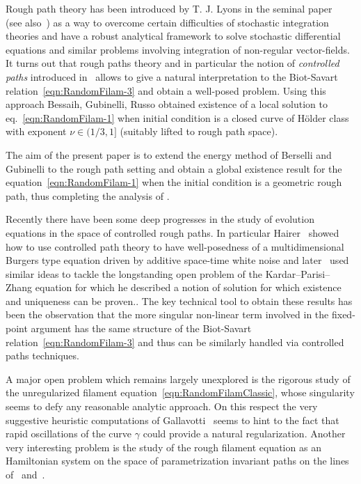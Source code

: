\documentclass[11pt,a4paper,reqno]{amsart}%
\theoremstyle{plain}
\theoremstyle{remark}
\theoremstyle{plain}
\numberwithin{equation}{section}
\begin{document}
Rough path theory has been introduced by T. J. Lyons in the seminal paper~\cite{[Lyons-1998]} (see also~\cites{[LyonsQian-2002],[LionsStFlour],[FrizVictoir]}) as a way to overcome certain difficulties of stochastic integration theories and have a robust analytical framework to solve stochastic differential equations and similar problems involving integration of non-regular vector-fields.
It turns out that rough paths theory and in particular the notion of \emph{controlled paths} introduced in~\cite{[Gubinelli-2004]} allows to give a natural interpretation to the Biot-Savart relation~\eqref{eqn:RandomFilam-3} and obtain a well-posed problem. Using this approach  Bessaih, Gubinelli, Russo \cite{[Bess+Gub_2005]}  obtained existence of a local solution to  eq.~\eqref{eqn:RandomFilam-1} when initial condition is a closed curve of
H\"{o}lder class with exponent $\nu\in ({1}/{3},1]$ (suitably lifted to rough path space).

The aim of the present paper is to extend the energy method of Berselli and Gubinelli to the rough path setting and obtain  a global existence result for the equation~\eqref{eqn:RandomFilam-1}  when the initial condition is a geometric rough path, thus completing the analysis of \cite{[Bess+Gub_2005]}.

Recently there have been some deep progresses in the study of evolution equations in the space of controlled rough paths. In particular Hairer~\cite{Hairer} showed how to use controlled path theory to have well-posedness of a multidimensional Burgers type equation driven by additive space-time white noise and later~\cite{KPZ} used similar ideas to tackle the longstanding open problem of the Kardar--Parisi--Zhang equation for which he described a notion of solution for which existence and uniqueness can be proven.. The key technical tool to obtain these results has been the observation that the more singular non-linear term involved in the fixed-point argument has the same structure of the Biot-Savart relation~\eqref{eqn:RandomFilam-3} and thus can be similarly handled via controlled paths techniques.

A major open problem which remains largely unexplored is the rigorous study of the unregularized filament equation~\eqref{eqn:RandomFilamClassic}, whose singularity seems to defy any reasonable analytic approach. On this respect the very suggestive heuristic computations of Gallavotti~\cite{Gallavotti} seems to hint to the fact that rapid oscillations of the curve $\gamma$ could provide a natural regularization. Another very interesting problem is the study of the rough filament equation as an Hamiltonian system on the space of parametrization invariant paths on the lines of~\cite{arnold_topological_1998} and~\cite{[Brylinski-1992]}. 
\end{document}
